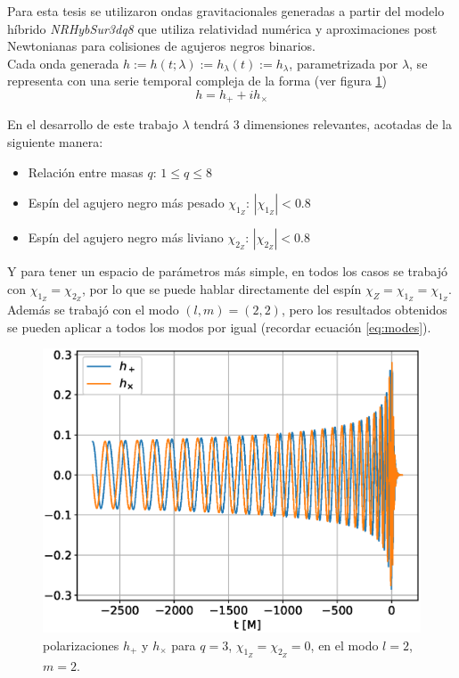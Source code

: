 Para esta tesis se utilizaron ondas gravitacionales generadas a partir del modelo híbrido \textit{NRHybSur3dq8}\cite{Varma_2019} que utiliza relatividad numérica y aproximaciones post Newtonianas para colisiones de agujeros negros binarios.
\\

Cada onda generada \( h := h(t; \lambda) := h_{\lambda}(t) := h_{\lambda} \), parametrizada por $\lambda$, se representa con una serie temporal compleja de la forma (ver figura \ref{fig:h_q3})
\[
h = h_+ + ih_{\times}
\]

En el desarrollo de este trabajo \(\lambda\) tendrá 3 dimensiones relevantes, acotadas de la siguiente manera:

\begin{itemize}
\item Relación entre masas $q$: $1 \le q \le 8$
\item Espín del agujero negro más pesado $\chi_{1_Z}$: $|\chi_{1_Z}| < 0.8$
\item Espín del agujero negro más liviano $\chi_{2_Z}$: $|\chi_{2_Z}| < 0.8$
\end{itemize}

Y para tener un espacio de parámetros más simple, en todos los casos se trabajó con $\chi_{1_Z} = \chi_{2_Z}$, por lo que se puede hablar directamente del espín $\chi_{Z}=\chi_{1_Z} = \chi_{1_Z}$. Además se trabajó con el modo $(l, m) =(2, 2)$, pero los resultados obtenidos se pueden aplicar a todos los modos por igual (recordar ecuación \eqref{eq:modes}).

\begin{figure}[h]
\centering
\includegraphics[width=.9\columnwidth]{figs/h_l2m2_q3.eps}
\caption{polarizaciones \(h_+\) y \(h_{\times}\) para $q = 3$, $\chi_{1_Z} = \chi_{2_Z} = 0$, en el modo $l=2$, $m=2$.}
\label{fig:h_q3}
\end{figure}



